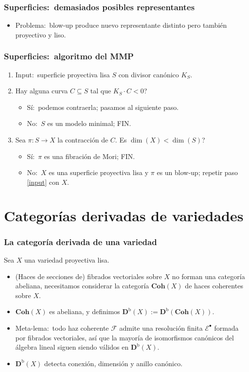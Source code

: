 \documentclass[12pt]{beamer}
\begin{document}
\begin{frame}
  \frametitle{Superficies:~demasiados posibles representantes}
  \begin{itemize}
    \item Problema:~blow-up produce nuevo representante distinto pero también proyectivo y liso.
  \end{itemize}
\end{frame}

\begin{frame}
  \frametitle{Superficies:~algoritmo del MMP}
  \begin{enumerate}
    \item Input:~superficie proyectiva lisa $S$ con divisor canónico $K_{S}$.\label{input}
      \pause
    \item Hay alguna curva $C \subseteq S$ tal que $K_{S}\cdot C < 0$?
      \pause
      \begin{itemize}
        \item Sí:~podemos contraerla; pasamos al siguiente paso.
        \item No:~$S$ es un modelo minimal; FIN.
      \end{itemize}
      \pause
    \item Sea $\pi \colon S \to X$ la contracción de $C$.
      Es $\dim(X) < \dim(S)$?
      \pause
      \begin{itemize}
        \item Sí:~$\pi$ es una fibración de Mori; FIN.
        \item No:~$X$ es una superficie proyectiva lisa y $\pi$ es un blow-up; repetir paso \ref{input} con $X$.
      \end{itemize}
  \end{enumerate}
\end{frame}

\section{Categorías derivadas de variedades}

\begin{frame}
  \frametitle{La categoría derivada de una variedad}
  Sea $X$ una variedad proyectiva lisa.
  \begin{itemize}
    \item (Haces de secciones de) fibrados vectoriales sobre $X$ no forman una categoría abeliana, necesitamos considerar la categoría $\mathbf{Coh}(X)$ de haces coherentes sobre $X$.
      \pause
    \item $\mathbf{Coh}(X)$ es abeliana, y definimos $\mathbf{D}^{\mathrm{b}}(X) := \mathbf{D}^{\mathrm{b}}(\mathbf{Coh}(X))$.
      \pause
    \item Meta-lema:~todo haz coherente $\mathscr{F}$ admite una resolución finita $\mathscr{E}^{\bullet}$ formada por fibrados vectoriales, así que la mayoría de isomorfismos canónicos del álgebra lineal siguen siendo válidos en $\mathbf{D}^{\mathrm{b}}(X)$.
      \pause
    \item $\mathbf{D}^{\mathrm{b}}(X)$ detecta conexión, dimensión y anillo canónico.
  \end{itemize}
\end{frame}
\end{document}
